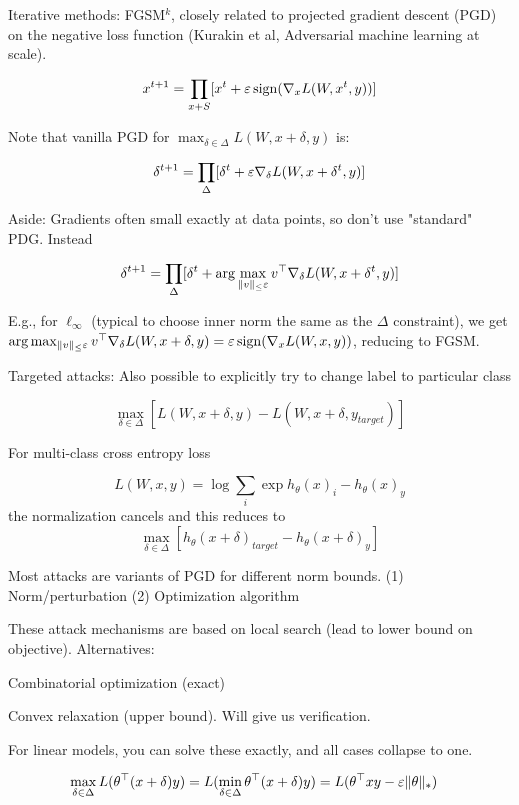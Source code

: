 \documentclass[english]{article}
\begin{document}
Iterative methods: FGSM$^k$, closely related to projected gradient descent (PGD) on the negative loss function (Kurakin et al, Adversarial machine learning at scale). 

$$x^{t+1} = \prod_{x+S}[x^t+ \varepsilon \operatorname{sign}(\nabla_x L(W,x^t,y))]$$ 

Note that vanilla PGD for $\max_{\delta\in\Delta} L(W,x+\delta,y)$ is: 

$$\delta^{t+1}=\prod_{\Delta}[\delta^t+\varepsilon \nabla_\delta L(W,x+\delta^t,y)]$$ 


Aside: Gradients often small exactly at data points, so don't use "standard" PDG. Instead


$$\delta^{t+1}=\prod_{\Delta}[\delta^t+
\arg\max_{\|v\|_\le \varepsilon} v^\top \nabla_\delta L(W,x+\delta^t,y)]$$

E.g., for $\ell_\infty$ (typical to choose inner norm the same as the $\Delta$ constraint), we get $\arg\max_{\|v\|_\le \varepsilon} v^\top \nabla_\delta L(W,x+\delta,y) = \varepsilon \operatorname{sign}(\nabla_x L(W,x,y))$, reducing to FGSM.

\item Targeted attacks: Also possible to explicitly try to change label to particular class 

$$\max_{\delta\in \Delta}[
L(W,x+\delta,y)
- 
L(W,x+\delta,y_{target})]
$$

For multi-class cross entropy loss 

$$
L(W,x,y)
= 
\log\sum_i \exp h_{\theta}(x)_i- h_{\theta}(x)_y
$$
the normalization cancels and this reduces to
$$\max_{\delta\in \Delta}[
h_{\theta}(x+\delta)_{target}
- 
h_{\theta}(x+\delta)_y]
$$

Most attacks are variants of PGD for different norm bounds. (1) Norm/perturbation (2) Optimization algorithm


\item These attack mechanisms are based on local search (lead to lower bound on objective). Alternatives: 

Combinatorial optimization (exact)

Convex relaxation (upper bound). Will give us verification. 

For linear models, you can solve these exactly, and all cases collapse to one. 


\begin{align*}
&\max_{\delta\in\Delta} L(\theta^\top(x+\delta)y) =
L(\min_{\delta\in\Delta}\theta^\top(x+\delta)y)= 
L(\theta^\top xy-\varepsilon \|\theta\|_*)
\end{align*}
\end{document}
